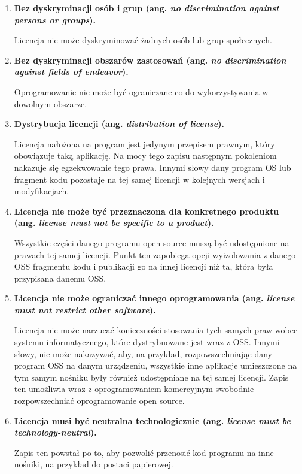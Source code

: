 \documentclass{article}
\begin{document}
\begin{enumerate}
    \item \textbf{Bez dyskryminacji osób i grup (ang. \emph{no discrimination against persons or groups}).}
    
    \hspace{4mm} Licencja nie może dyskryminować żadnych osób lub grup społecznych.
    
    \item \textbf{Bez dyskryminacji obszarów zastosowań (ang. \emph{no discrimination against fields of endeavor}).}
    
    \hspace{4mm} Oprogramowanie nie może być ograniczane co do wykorzystywania w dowolnym obszarze.
    
    \item \textbf{Dystrybucja licencji (ang. \emph{distribution of license}).}
    
    \hspace{4mm} Licencja nałożona na program jest jedynym przepisem prawnym, który obowiązuje taką aplikację. Na mocy tego zapisu następnym pokoleniom nakazuje się egzekwowanie tego prawa. Innymi słowy dany program OS lub fragment kodu pozostaje na tej samej licencji w kolejnych wersjach i modyfikacjach.
    
    \item \textbf{Licencja nie może być przeznaczona dla konkretnego produktu (ang. \emph{license must not be specific to a product}).}
    
    \hspace{4mm} Wszystkie części danego programu open source muszą być udostępnione na prawach tej samej licencji. Punkt ten zapobiega opcji wyizolowania z danego OSS fragmentu kodu i publikacji go na innej licencji niż ta, która była przypisana danemu OSS.
    
    \item \textbf{Licencja nie może ograniczać innego oprogramowania (ang. \emph{license must not restrict other software}).}
    
    \hspace{4mm} Licencja nie może narzucać konieczności stosowania tych samych praw wobec systemu informatycznego, które dystrybuowane jest wraz z OSS. Innymi słowy, nie może nakazywać, aby, na przykład, rozpowszechniając dany program OSS na danym urządzeniu, wszystkie inne aplikacje umieszczone na tym samym nośniku były również udostępniane na tej samej licencji. Zapis ten umożliwia wraz z oprogramowaniem komercyjnym swobodnie rozpowszechniać oprogramowanie open source.\newpage
    
    \item \textbf{Licencja musi być neutralna technologicznie (ang. \emph{license must be technology-neutral}).}
    
    \hspace{4mm} Zapis ten powstał po to, aby pozwolić przenosić kod programu na inne nośniki, na przykład do postaci papierowej.
\end{enumerate}
\end{document}
